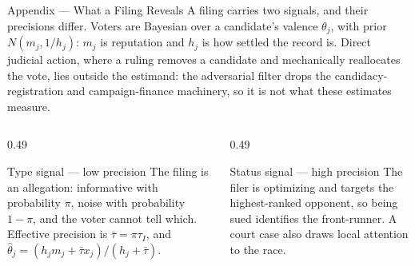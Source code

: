 
\begin{frame}{Appendix --- What a Filing Reveals}
\hypertarget{app:theory}{}
\footnotesize
A filing carries two signals, and their precisions differ. Voters are Bayesian
over a candidate's valence $\theta_j$, with prior $N(m_j, 1/h_j)$: $m_j$ is
reputation and $h_j$ is how settled the record is. Direct judicial action,
where a ruling removes a candidate and mechanically reallocates the vote, lies
outside the estimand: the adversarial filter drops the candidacy-registration
and campaign-finance machinery, so it is not what these estimates measure.
\smallskip
\begin{columns}[T]
\begin{column}{0.49\textwidth}
  \begin{block}{Type signal --- low precision}
  \scriptsize
  The filing is an allegation: informative with probability $\pi$, noise with
  probability $1-\pi$, and the voter cannot tell which. Effective precision is
  $\bar\tau = \pi\tau_I$, and
  $\hat\theta_j = (h_j m_j + \bar\tau x_j)/(h_j + \bar\tau)$.
  \hfill{}
  \end{block}
\end{column}
\begin{column}{0.49\textwidth}
  \begin{block}{Status signal --- high precision}
  \scriptsize
  The filer is optimizing and targets the highest-ranked opponent, so being
  sued identifies the front-runner. A court case also draws local attention to
  the race.
  \hfill{}
  \end{block}
\end{column}
\end{columns}
\smallskip


\end{frame}
